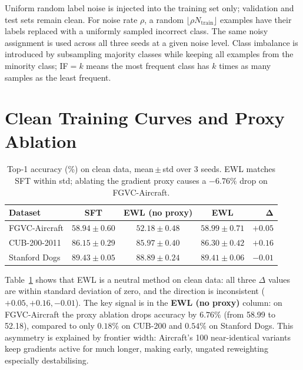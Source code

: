Uniform random label noise is injected into the training set only; validation
and test sets remain clean.
For noise rate $\rho$, a random $\lfloor \rho N_{\text{train}} \rfloor$
examples have their labels replaced with a uniformly sampled incorrect class.
The same noisy assignment is used across all three seeds at a given noise
level.
Class imbalance is introduced by subsampling majority classes while keeping
all examples from the minority class; IF$=k$ means the most frequent class has
$k$ times as many samples as the least frequent.

\section{Clean Training Curves and Proxy Ablation}
\label{app:curves}

\begin{table}[h]
  \centering
  \small
  \caption{
    Top-1 accuracy (\%) on clean data, mean\,$\pm$\,std over 3 seeds.
    EWL matches SFT within std; ablating the gradient proxy causes a
    $-6.76\%$ drop on FGVC-Aircraft.
  }
  \label{tab:main_results}
  \setlength{\tabcolsep}{4pt}
  \begin{tabular}{lcccr}
    \toprule
    \textbf{Dataset} & \textbf{SFT} & \textbf{EWL (no proxy)} & \textbf{EWL} & $\boldsymbol{\Delta}$ \\
    \midrule
    FGVC-Aircraft    & $58.94{\pm}0.60$ & $52.18{\pm}0.48$ & $58.99{\pm}0.71$ & $+0.05$ \\
    CUB-200-2011     & $86.15{\pm}0.29$ & $85.97{\pm}0.40$ & $86.30{\pm}0.42$ & $+0.16$ \\
    Stanford Dogs    & $89.43{\pm}0.05$ & $88.89{\pm}0.24$ & $89.41{\pm}0.06$ & $-0.01$ \\
    \bottomrule
  \end{tabular}
\end{table}

Table~\ref{tab:main_results} shows that EWL is a neutral method on clean data:
all three $\Delta$ values are within standard deviation of zero, and the
direction is inconsistent ($+0.05, +0.16, -0.01$).
The key signal is in the \textbf{EWL (no proxy)} column: on FGVC-Aircraft the
proxy ablation drops accuracy by $6.76\%$ (from 58.99 to 52.18), compared to
only $0.18\%$ on CUB-200 and $0.54\%$ on Stanford Dogs.
This asymmetry is explained by frontier width: Aircraft's 100 near-identical
variants keep gradients active for much longer, making early, ungated
reweighting especially destabilising.

